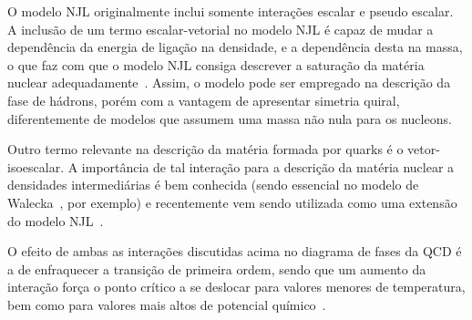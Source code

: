 O modelo NJL originalmente inclui somente interações escalar e pseudo escalar. A inclusão de um termo escalar-vetorial no modelo NJL é capaz de mudar a dependência da energia de ligação na densidade, e a dependência desta na massa, o que faz com que o modelo NJL consiga descrever a saturação da matéria nuclear adequadamente~\cite{Koch}. Assim, o modelo pode ser empregado na descrição da fase de hádrons, porém com a vantagem de apresentar simetria quiral, diferentemente de modelos que assumem uma massa não nula para os nucleons. 

Outro termo relevante na descrição da matéria formada por quarks é o vetor-isoescalar. A importância de tal interação para a descrição da matéria nuclear a densidades intermediárias é bem conhecida (sendo essencial no modelo de Walecka~\cite{Advances16}, por exemplo) e recentemente vem sendo utilizada como uma extensão do modelo NJL~\cite{Abuki, NJLv}.


O efeito de ambas as interações discutidas acima no diagrama de fases da QCD é a de enfraquecer a transição de primeira ordem, sendo que um aumento da interação força o ponto crítico a se deslocar para valores menores de temperatura, bem como para valores mais altos de potencial químico~\cite{NJLv, japoneses}.

